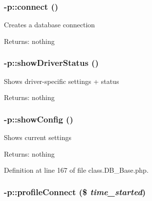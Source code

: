 \subsubsection{-p::connect ()\hspace{0.3cm}{\tt  [abstract]}}\label{protocolDB__Base-p_bc1d1db037ff1a9a097ce99d48f0f46d}


Creates a database connection \begin{Desc}
\item[Returns:]nothing \end{Desc}
\subsubsection{-p::showDriverStatus ()\hspace{0.3cm}{\tt  [abstract]}}\label{protocolDB__Base-p_04c282dd4a3f1f030ed9e0a13da1d85d}


Shows driver-specific settings + status \begin{Desc}
\item[Returns:]nothing \end{Desc}
\subsubsection{-p::showConfig ()}\label{protocolDB__Base-p_463552aa9409fd41d6fd2093f06f52e5}


Shows current settings \begin{Desc}
\item[Returns:]nothing \end{Desc}


Definition at line 167 of file class.DB\_\-Base.php.
\subsubsection{-p::profileConnect (\$ {\em time\_\-started})}\label{protocolDB__Base-p_a9a2c1b3fe46aa0ae3ae1dbcd7ccaf76}


